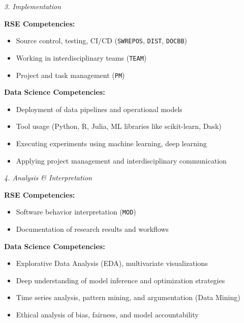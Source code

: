 \documentclass[
        english,biblatex
    ]{lni}
\providecommand{\tightlist}{%
    \setlength{\itemsep}{0pt}\setlength{\parskip}{0pt}}
\begin{document}
    \emph{3. Implementation}

    \textbf{RSE Competencies:}

    \begin{itemize}
    \tightlist
    \item
      Source control, testing, CI/CD (\texttt{SWREPOS}, \texttt{DIST},
      \texttt{DOCBB})
    \item
      Working in interdisciplinary teams (\texttt{TEAM})
    \item
      Project and task management (\texttt{PM})
    \end{itemize}

    \textbf{Data Science Competencies:}

    \begin{itemize}
    \tightlist
    \item
      Deployment of data pipelines and operational models
    \item
      Tool usage (Python, R, Julia, ML libraries like scikit-learn,
      Dask)
    \item
      Executing experiments using machine learning, deep learning
    \item
      Applying project management and interdisciplinary communication
    \end{itemize}

    \emph{4. Analysis \& Interpretation}

    \textbf{RSE Competencies:}

    \begin{itemize}
    \tightlist
    \item
      Software behavior interpretation (\texttt{MOD})
    \item
      Documentation of research results and workflows
    \end{itemize}

    \textbf{Data Science Competencies:}

    \begin{itemize}
    \tightlist
    \item
      Explorative Data Analysis (EDA), multivariate visualizations
    \item
      Deep understanding of model inference and optimization strategies
    \item
      Time series analysis, pattern mining, and argumentation (Data
      Mining)
    \item
      Ethical analysis of bias, fairness, and model accountability
    \end{itemize}
\end{document}
